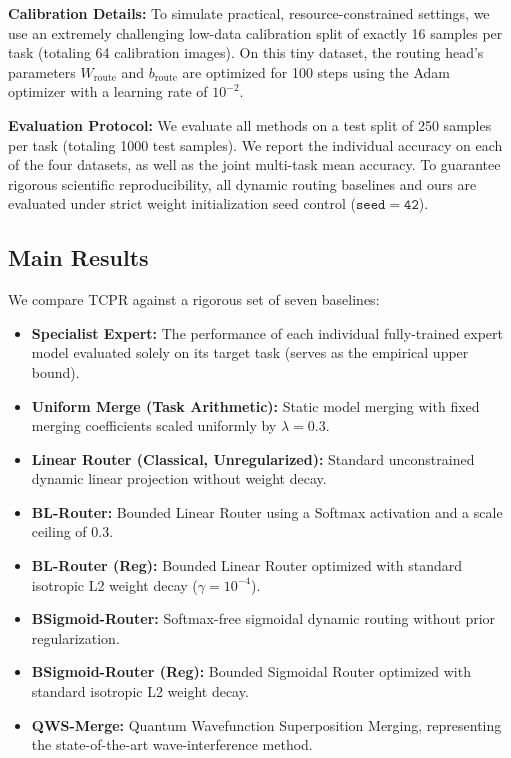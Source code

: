 \textbf{Calibration Details:} To simulate practical, resource-constrained settings, we use an extremely challenging low-data calibration split of exactly 16 samples per task (totaling 64 calibration images). On this tiny dataset, the routing head's parameters $W_{\text{route}}$ and $b_{\text{route}}$ are optimized for 100 steps using the Adam optimizer with a learning rate of $10^{-2}$.

\textbf{Evaluation Protocol:} We evaluate all methods on a test split of 250 samples per task (totaling 1000 test samples). We report the individual accuracy on each of the four datasets, as well as the joint multi-task mean accuracy. To guarantee rigorous scientific reproducibility, all dynamic routing baselines and ours are evaluated under strict weight initialization seed control ($\mathtt{seed=42}$).

\subsection{Main Results}
We compare TCPR against a rigorous set of seven baselines:
\begin{itemize}
    \item \textbf{Specialist Expert:} The performance of each individual fully-trained expert model evaluated solely on its target task (serves as the empirical upper bound).
    \item \textbf{Uniform Merge (Task Arithmetic):} Static model merging with fixed merging coefficients scaled uniformly by $\lambda = 0.3$.
    \item \textbf{Linear Router (Classical, Unregularized):} Standard unconstrained dynamic linear projection without weight decay.
    \item \textbf{BL-Router:} Bounded Linear Router using a Softmax activation and a scale ceiling of $0.3$.
    \item \textbf{BL-Router (Reg):} Bounded Linear Router optimized with standard isotropic L2 weight decay ($\gamma=10^{-4}$).
    \item \textbf{BSigmoid-Router:} Softmax-free sigmoidal dynamic routing without prior regularization.
    \item \textbf{BSigmoid-Router (Reg):} Bounded Sigmoidal Router optimized with standard isotropic L2 weight decay.
    \item \textbf{QWS-Merge:} Quantum Wavefunction Superposition Merging, representing the state-of-the-art wave-interference method.
\end{itemize}

